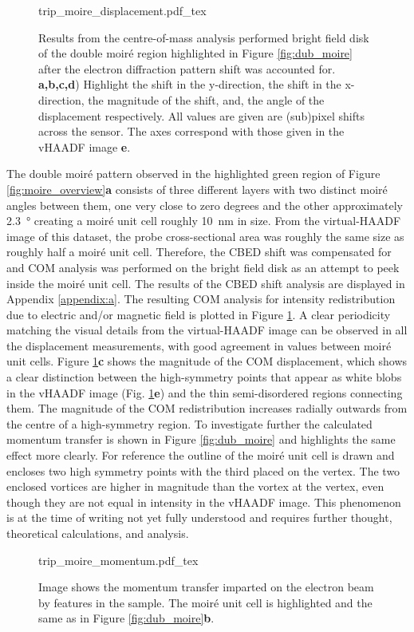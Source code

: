 \begin{figure}
    \centering
    \def\svgwidth{.95\linewidth}
    {trip_moire_displacement.pdf_tex}
    \caption{Results from the centre-of-mass analysis performed bright field disk of the double moiré region highlighted in Figure \ref{fig:dub_moire} after the electron diffraction pattern shift was accounted for. \textbf{a,b,c,d}) Highlight the shift in the y-direction, the shift in the x-direction, the magnitude of the shift, and, the angle of the displacement respectively. All values are given are (sub)pixel shifts across the sensor. The axes correspond with those given in the vHAADF image \textbf{e}.}
    \label{fig:trip_m_dis}
\end{figure}

The double moiré pattern observed in the highlighted green region of Figure \ref{fig:moire_overview}\textbf{a} consists of three different layers with two distinct moiré angles between them, one very close to zero degrees and the other approximately \SI{2.3}{\degree} creating a moiré unit cell roughly \SI{10}{\nano\meter} in size. From the virtual-HAADF image of this dataset, the probe cross-sectional area was roughly the same size as roughly half a moiré unit cell. Therefore, the CBED shift was compensated for and COM analysis was performed on the bright field disk as an attempt to peek inside the moiré unit cell. The results of the CBED shift analysis are displayed in Appendix \ref{appendix:a}.
The resulting COM analysis for intensity redistribution due to electric and/or magnetic field is plotted in Figure \ref{fig:trip_m_dis}. A clear periodicity matching the visual details from the virtual-HAADF image can be observed in all the displacement measurements, with good agreement in values between moiré unit cells. Figure \ref{fig:trip_m_dis}\textbf{c} shows the magnitude of the COM displacement, which shows a clear distinction between the high-symmetry points that appear as white blobs in the vHAADF image (Fig. \ref{fig:trip_m_dis}\textbf{e}) and the thin semi-disordered regions connecting them. The magnitude of the COM redistribution increases radially outwards from the centre of a high-symmetry region. To investigate further the calculated momentum transfer is shown in Figure \ref{fig:dub_moire} and highlights the same effect more clearly. For reference the outline of the moiré unit cell is drawn and encloses two high symmetry points with the third placed on the vertex. The two enclosed vortices are higher in magnitude than the vortex at the vertex, even though they are not equal in intensity in the vHAADF image. This phenomenon is at the time of writing not yet fully understood and requires further thought, theoretical calculations, and analysis.


\begin{figure}
    \centering
    \def\svgwidth{.9\linewidth}
    {trip_moire_momentum.pdf_tex}
    \caption{Image shows the momentum transfer imparted on the electron beam by features in the sample. The moiré unit cell is highlighted and the same as in Figure \ref{fig:dub_moire}\textbf{b}.}
    \label{fig:trip_m_mom}
\end{figure}

